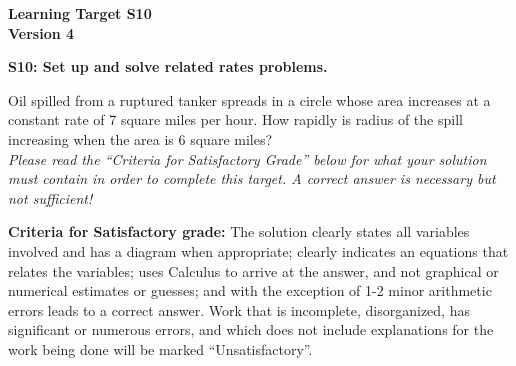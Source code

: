 \documentclass[10pt]{article}
\begin{document}
	\vspace*{0in}

		\begin{center}
			\textbf{Learning Target S10 \\
			Version 4} %
		\end{center}


\begin{framed}
	\textbf{S10: Set up and solve related rates problems.}
\end{framed}

Oil spilled from a ruptured tanker spreads in a circle whose area increases at a constant rate of 7 square miles per hour.  How rapidly is radius of the spill increasing when the area is 6 square miles? \\ 
 
\emph{Please read the ``Criteria for Satisfactory Grade'' below for what your solution must contain in order to complete this target. A correct answer is necessary but not sufficient!} 




\vfill

\begin{small}
    \begin{framed}
        	\textbf{Criteria for Satisfactory grade:} The solution clearly states all variables involved and has a diagram when appropriate; clearly indicates an equations that relates the variables; uses Calculus to arrive at the answer, and not graphical or numerical estimates or guesses; and with the exception of 1-2 minor arithmetic errors leads to a correct answer. Work that is incomplete, disorganized, has significant or numerous errors, and which does not include explanations for the work being done will be marked ``Unsatisfactory''. 
    \end{framed}

\end{small}
\end{document}
